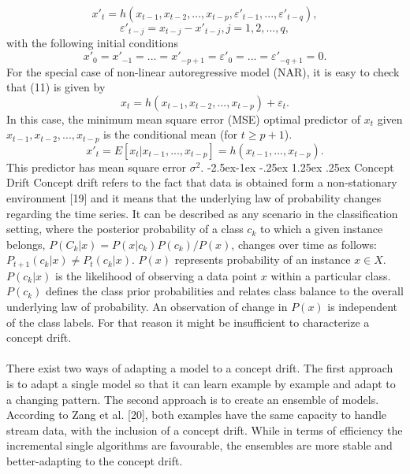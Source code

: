 \documentclass[runningheads,a4paper]{llncs}[2015/06/24]
\makeatletter
\renewcommand\paragraph{\@startsection{paragraph}{4}{\z@}%
            {-2.5ex\@plus -1ex \@minus -.25ex}%
            {1.25ex \@plus .25ex}%
            {\normalfont\normalsize\bfseries}}
\makeatother
\begin{document}
\begin{equation}
x'_t = h(x_{t−1}, x_{t−2},..., x_{t−p}, ε'_{t−1},..., ε'_{t−q} ), 
\end{equation}
\begin{equation}
ε'_{t− j} = x_{t− j} − x'_{t− j}, j = 1, 2,..., q,
\end{equation}
with the following initial conditions
\begin{equation}
x'_0 = x'_{−1} =...= x'_{−p+1} = ε'_0 =...= ε'_{−q+1} = 0. 
\end{equation}
For the special case of non-linear autoregressive model (NAR), it is easy to check that (11) is given by
\begin{equation}
x_t = h(x_{t−1}, x_{t−2},..., x_{t−p}) + ε_t .
\end{equation}
In this case, the minimum mean square error (MSE) optimal predictor of $x_t$ given $x_{t−1}, x_{t−2},..., x_{t−p}$ is the conditional mean (for $t ≥ p + 1$).
\begin{equation}
x'_t = E[x_t|x_{t−1},..., x_{t−p}] = h(x_{t−1},..., x_{t−p}).
\end{equation}
This predictor has mean square error $σ^2$.
\paragraph{Concept Drift}
Concept drift refers to the fact that data is obtained form a non-stationary environment [19] and it means that the underlying law of probability changes regarding the time series. It can be described as any scenario in the classification setting, where the posterior probability of  a class $c_k$ to which a given instance belongs, $P(C_k|x)= P(x|c_k)P(c_k)/P(x)$, changes over time as follows: $P_{t+1}(c_k|x)≠ P_t(c_k |x)$. $P(x)$ represents probability of an instance  $x ∈ X$. $P(c_k|x)$ is the likelihood of observing a data point $x$ within a particular class. $P(c_k)$ defines the class prior probabilities and relates class balance to the overall underlying law of probability. An observation of change in $P(x)$ is independent of the class labels. For that reason it might be insufficient to characterize a concept drift. \\\\ There exist two ways of adapting a model to a concept drift. The first approach is to adapt a single model so that it can learn example by example and adapt to a changing pattern. The second approach is to create an ensemble of models. According to Zang et al. [20], both examples have the same capacity to handle stream data, with the inclusion of a concept drift. While in terms of efficiency the incremental single algorithms are favourable, the ensembles are more stable and better-adapting to the concept drift.	
\end{document}

